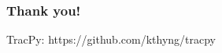 \documentclass[ignorenonframetext]{beamer}
\begin{document}
\begin{frame}
	\frametitle{Thank you!}
	TracPy: https://github.com/kthyng/tracpy
	\begin{figure}[htbp]
		\centering
	\end{figure}
\end{frame}


\end{document}
